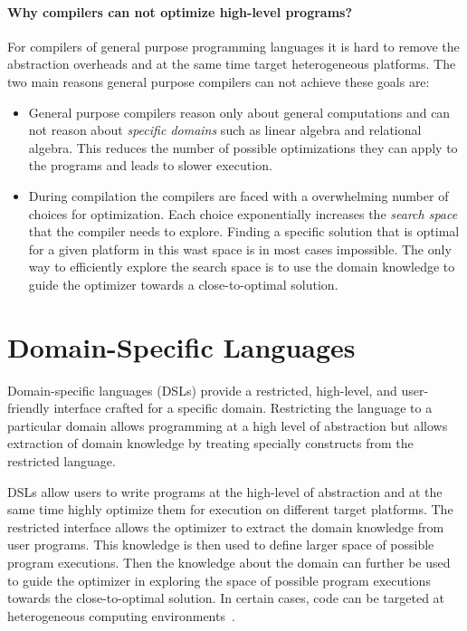 \paragraph{Why compilers can not optimize high-level programs?} For compilers of general purpose programming languages it is hard to remove the abstraction overheads and at the same time target heterogeneous platforms. The two main
 reasons general purpose compilers can not achieve these goals are:\begin{itemize}

 \item General purpose compilers reason only about general computations and can not reason
   about \emph{specific domains} such as linear algebra and relational algebra. This reduces
   the number of possible optimizations they can apply to the programs and leads to
   slower execution.

 \item During compilation the compilers are faced with a overwhelming number of choices
   for optimization. Each choice exponentially increases the \emph{search space}
   that the compiler needs to explore. Finding a specific solution that is optimal
   for a given platform in this wast space is in most cases impossible. The only way
   to efficiently explore the search space is to use the domain knowledge to guide
   the optimizer towards a close-to-optimal solution.
 \end{itemize}

\section{Domain-Specific Languages}
\label{sec:domain-specific-languages}

Domain-specific languages (DSLs) provide a restricted,
 high-level, and user-friendly interface crafted for a specific domain.
 Restricting the language to a particular domain allows programming at
 a high level of abstraction but allows extraction of domain knowledge by
 treating specially constructs from the restricted language.

DSLs allow users to write programs at the high-level of abstraction and at the
 same time highly optimize them for execution on different target platforms. The restricted interface allows the optimizer to extract the domain knowledge from user programs. This knowledge is then used to define larger space of possible program executions. Then the knowledge about the domain can further be used to guide the optimizer in exploring the space of possible program executions towards the close-to-optimal solution. In certain cases, code can be targeted at
 heterogeneous computing environments~\cite{rompf_optimizing_2013}.


